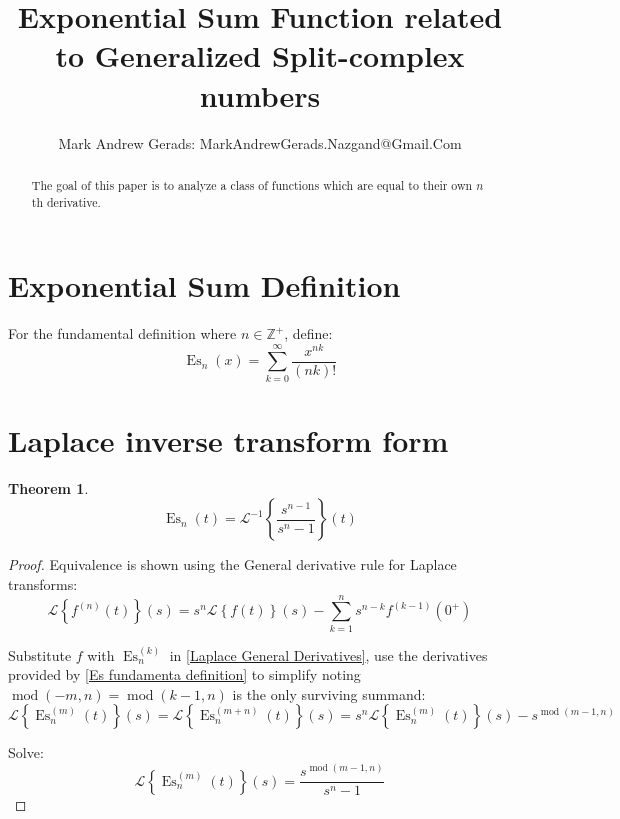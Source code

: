 \documentclass[]{article}
\author{Mark Andrew Gerads: MarkAndrewGerads.Nazgand@Gmail.Com}
\title{Exponential Sum Function related to Generalized Split-complex numbers}
\DeclareMathOperator{\es}{Es}
\DeclareMathOperator{\md}{mod}
\newcommand{\pqty}[1]{{\left(#1\right)}}
\newcommand{\Bqty}[1]{{\left\{#1\right\}}}
\newcommand{\laplace}[1]{\mathcal{L}\Bqty{#1}\pqty{s}}
\newcommand{\laplaceInv}[1]{\mathcal{L}^{-1}\Bqty{#1}\pqty{t}}
\newtheorem{theorem}{Theorem}[section]
\numberwithin{equation}{section}
\begin{document}
	
	\maketitle
	
	\begin{abstract}
		The goal of this paper is to analyze a class of functions which are equal to their own \(n\)th derivative.
	\end{abstract}
	
	\section{Exponential Sum Definition}
	For the fundamental definition where \(n\in\mathbb{Z}^+\), define:
	\begin{equation}
	\label{Es fundamenta definition}
	\es_n\pqty{x}=
	\sum_{k=0}^{\infty}\frac{x^{nk}}{\pqty{nk}!}
	\end{equation}
	
	\section{Laplace inverse transform form}
	\begin{theorem}
			\begin{equation}
		\es_n\pqty{t}=
		\laplaceInv{\frac{s^{n-1}}{s^n-1}}
		\end{equation}
	\end{theorem}
	\begin{proof}
			Equivalence is shown using the General derivative rule for Laplace transforms:
		\begin{equation}
		\label{Laplace General Derivatives}
		\laplace{f^{(n)}\pqty{t}}=
		s^n \laplace{f\pqty{t}} - \sum_{k=1}^{n} s^{n-k} f^{(k-1)}\pqty{0^{+}}
		\end{equation}
		
		Substitute \(f\) with \(\es_n^{(k)}\) in \eqref{Laplace General Derivatives}, use the derivatives provided by \eqref{Es fundamenta definition} to simplify noting \(\md\pqty{-m,n}=\md\pqty{k-1,n}\) is the only surviving summand:
		\begin{equation}
		\laplace{\es_n^{(m)}\pqty{t}}=
		\laplace{\es_n^{(m+n)}\pqty{t}}=
		s^n\laplace{\es_n^{(m)}\pqty{t}}-s^{\md\pqty{m-1,n}}
		\end{equation}
		
		Solve:
		\begin{equation}
		\laplace{\es_n^{(m)}\pqty{t}}=
		\frac{s^{\md\pqty{m-1,n}}}{s^n-1}
		\end{equation}
	\end{proof}
	
\end{document}
